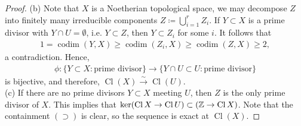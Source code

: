 \documentclass[11pt,a4paper,footinclude=true,headinclude=true]{scrbook} %
\let\Im\relax
\DeclareMathOperator{\Im}{Im}
\DeclareMathOperator{\Cl}{Cl}
\DeclareMathOperator{\codim}{codim}
\newcommand{\<}{\langle}
\newcommand{\>}{\rangle}
\newcommand{\isoto}{\overset{\sim}{\to}}
\begin{document}
\begin{proof}
    (b) Note that $X$ is a Noetherian topological space, we may decompose $Z$ into finitely many irreducible components $Z\coloneqq\bigcup_{i=1}^rZ_i$. If $Y\subset X$ is a prime divisor with $Y\cap U=\emptyset$, i.e. $Y\subset Z$, then $Y\subset Z_i$ for some $i$. It follows that
    \begin{align*}
        1=\codim(Y,X)\geq\codim(Z_i,X)\geq\codim(Z,X)\geq2,
    \end{align*}
    a contradiction. Hence,
    \begin{align*}
        \phi:\{Y\subset X:\text{prime divisor}\}\longrightarrow\{Y\cap U\subset U:\text{prime divisor}\}
    \end{align*}
    is bijective, and therefore, $\Cl(X)\isoto\Cl(U)$.\\
    
    (c) If there are no prime divisors $Y\subset X$ meeting $U$, then $Z$ is the only prime divisor of $X$. This implies that $\ker(\Cl X\to\Cl U)\subset\Im(\mathbb{Z}\to\Cl X)$. Note that the containment $(\supset)$ is clear, so the sequence is exact at $\Cl(X)$.
\end{proof}

\newpage
\end{document}
